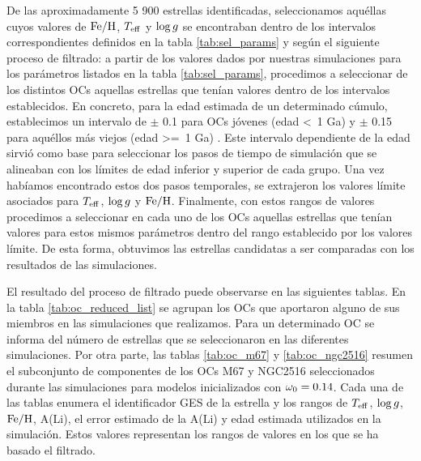 De las aproximadamente 5 900 estrellas identificadas, seleccionamos aquéllas cuyos valores de $\mathrm{Fe}/\mathrm{H}$, $T_{\mathrm{eff}}$ y $\mathrm{log} \, g$ se encontraban dentro de los intervalos correspondientes definidos en la tabla \ref{tab:sel_params} y según el siguiente proceso de filtrado: a partir de los valores dados por nuestras simulaciones para los parámetros listados en la tabla \ref{tab:sel_params}, procedimos a seleccionar de los distintos OCs aquellas estrellas que tenían valores dentro de los intervalos establecidos. En concreto, para la edad estimada de un determinado cúmulo, establecimos un intervalo de $\pm$ 0.1 para OCs jóvenes (edad <\, 1 Ga) y $\pm$ 0.15 para aquéllos más viejos (edad >=\, 1 Ga) \citep[véase][para más detalle sobre los valores referidos]{Cantat-Gaudin2020}. Este intervalo dependiente de la edad sirvió como base para seleccionar los pasos de tiempo de simulación que se alineaban con los límites de edad inferior y superior de cada grupo. Una vez habíamos encontrado estos dos pasos temporales, se extrajeron los valores límite asociados para $T_{\mathrm{eff}}$, $\mathrm{log} \, g$ y $\mathrm{Fe}/\mathrm{H}$. Finalmente, con estos rangos de valores procedimos a seleccionar en cada uno de los OCs aquellas estrellas que tenían valores para estos mismos parámetros dentro del rango establecido por los valores límite. De esta forma, obtuvimos las estrellas candidatas a ser comparadas con los resultados de las simulaciones.\par

El resultado del proceso de filtrado puede observarse en las siguientes tablas. En la tabla \ref{tab:oc_reduced_list} se agrupan los OCs que aportaron alguno de sus miembros en las simulaciones que realizamos. Para un determinado OC se informa del número de estrellas que se seleccionaron en las diferentes simulaciones. Por otra parte, las tablas \ref{tab:oc_m67} y \ref{tab:oc_ngc2516} resumen el subconjunto de componentes de los OCs M67 y NGC2516 seleccionados durante las simulaciones para modelos inicializados con $\omega_{\mathrm{0}} = 0.14$. Cada una de las tablas enumera el identificador GES de la estrella y los rangos de $T_{\mathrm{eff}}$, $\mathrm{log} \, g$, $\mathrm{Fe}/\mathrm{H}$, A(Li), el error estimado de la A(Li) y edad estimada utilizados en la simulación. Estos valores representan los rangos de valores en los que se ha basado el filtrado.


\newpage
{}
\recalctypearea

